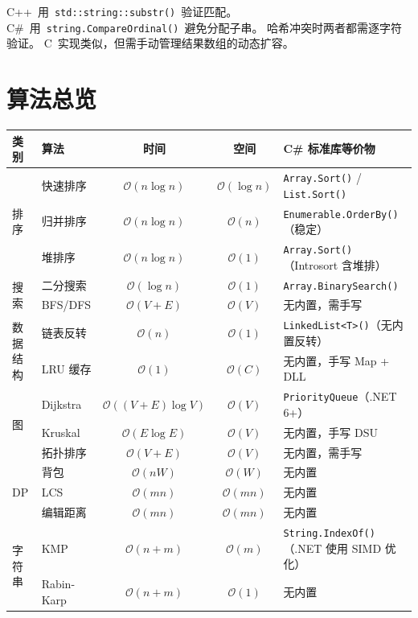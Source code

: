 \documentclass[12pt,a4paper,fontset=fandol]{ctexbook}
\newcommand{\bigO}[1]{\mathcal{O}(#1)}
\newcommand{\Fn}[1]{\texttt{#1()}}
\newcommand{\Tp}[1]{\texttt{#1}}
\begin{document}
\begin{compare}
C++~用~\Fn{std::\allowbreak{}string::\allowbreak{}substr}~验证匹配。
C\#~用~\Fn{string.\allowbreak{}Compare\allowbreak{}Ordinal}~避免分配子串。
哈希冲突时两者都需逐字符验证。
C~实现类似，但需手动管理结果数组的动态扩容。
\end{compare}

\makeatletter
{\let\saved@endpart\@endpart
 \def\@endpart{\addcontentsline{toc}{part}{算法总览}\saved@endpart}%
 \part*{算法总览}}
\makeatother

\begin{center}
\small
\begin{tabularx}{\textwidth}{l l c c X}
  \hline
  \textbf{类别} & \textbf{算法} & \textbf{时间} & \textbf{空间} & \textbf{C\# 标准库等价物} \\
  \hline
  \multirow{3}{*}{排序}
    & 快速排序 & $\bigO{n\log n}$ & $\bigO{\log n}$ & \Fn{Array.Sort} / \Fn{List.Sort} \\
    & 归并排序 & $\bigO{n\log n}$ & $\bigO{n}$ & \Fn{Enumerable.OrderBy}（稳定） \\
    & 堆排序   & $\bigO{n\log n}$ & $\bigO{1}$ & \Fn{Array.Sort}（Introsort 含堆排） \\
  \hline
  \multirow{2}{*}{搜索}
    & 二分搜索 & $\bigO{\log n}$ & $\bigO{1}$ & \Fn{Array.BinarySearch} \\
    & BFS/DFS  & $\bigO{V+E}$ & $\bigO{V}$ & 无内置，需手写 \\
  \hline
  \multirow{2}{*}{数据结构}
    & 链表反转 & $\bigO{n}$ & $\bigO{1}$ & \Fn{LinkedList<T>}（无内置反转） \\
    & LRU 缓存 & $\bigO{1}$ & $\bigO{C}$ & 无内置，手写 Map + DLL \\
  \hline
  \multirow{3}{*}{图}
    & Dijkstra & $\bigO{(V+E)\log V}$ & $\bigO{V}$ & \Tp{PriorityQueue}（.NET 6+） \\
    & Kruskal  & $\bigO{E\log E}$ & $\bigO{V}$ & 无内置，手写 DSU \\
    & 拓扑排序 & $\bigO{V+E}$ & $\bigO{V}$ & 无内置，需手写 \\
  \hline
  \multirow{3}{*}{DP}
    & 背包 & $\bigO{nW}$ & $\bigO{W}$ & 无内置 \\
    & LCS & $\bigO{mn}$ & $\bigO{mn}$ & 无内置 \\
    & 编辑距离 & $\bigO{mn}$ & $\bigO{mn}$ & 无内置 \\
  \hline
  \multirow{2}{*}{字符串}
    & KMP & $\bigO{n+m}$ & $\bigO{m}$ & \Fn{String.IndexOf}（.NET 使用 SIMD 优化） \\
    & Rabin-Karp & $\bigO{n+m}$ & $\bigO{1}$ & 无内置 \\
  \hline
\end{tabularx}
\end{center}
\end{document}
